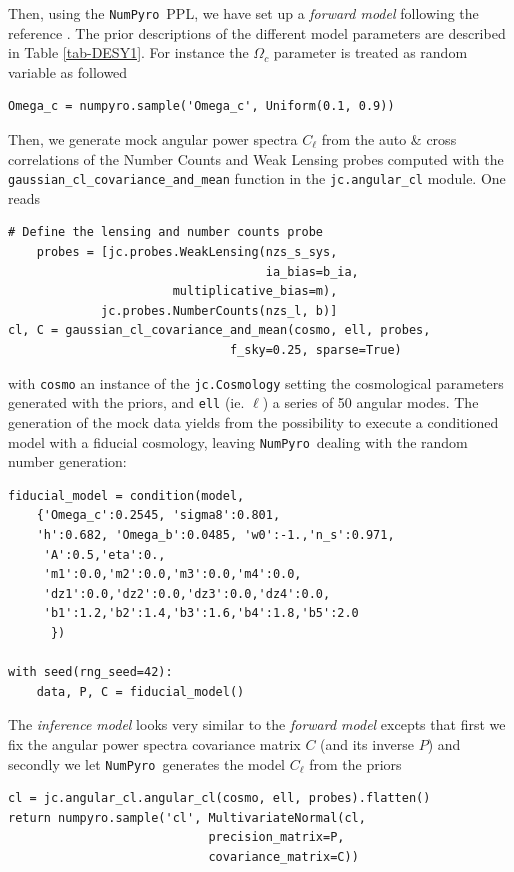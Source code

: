 \documentclass[final,5p,times,twocolumn,authoryear]{elsarticle}
\newcommand{\numpyro}{\texttt{NumPyro}}
\begin{document}
Then, using the \numpyro\ PPL, we have set up a \textit{forward model} following the reference \citep{2018PhRvD..98d3526A}. The prior descriptions of the different model parameters are described in Table \ref{tab-DESY1}.  For instance the $\Omega_c$ parameter is treated as random variable as followed
\begin{verbatim}
Omega_c = numpyro.sample('Omega_c', Uniform(0.1, 0.9))
\end{verbatim}
Then, we generate mock angular power spectra $C_\ell$ from the auto \& cross correlations of the Number Counts and Weak Lensing probes computed with the \texttt{gaussian\_cl\_covariance\_and\_mean} function in the \texttt{jc.angular\_cl} module. One reads
\begin{verbatim}
# Define the lensing and number counts probe
    probes = [jc.probes.WeakLensing(nzs_s_sys, 
                                    ia_bias=b_ia,
                       multiplicative_bias=m),
             jc.probes.NumberCounts(nzs_l, b)]
cl, C = gaussian_cl_covariance_and_mean(cosmo, ell, probes, 
                               f_sky=0.25, sparse=True)
\end{verbatim} 
with \texttt{cosmo} an instance of the \texttt{jc.Cosmology} setting the cosmological parameters generated with the priors, and \texttt{ell} (ie. $\ell$) a series of 50 angular modes. The generation of the mock data yields from the possibility to execute a conditioned model with a fiducial cosmology, leaving \numpyro\ dealing with the random number generation:
\begin{verbatim}
fiducial_model = condition(model,
    {'Omega_c':0.2545, 'sigma8':0.801, 
    'h':0.682, 'Omega_b':0.0485, 'w0':-1.,'n_s':0.971,
     'A':0.5,'eta':0.,
     'm1':0.0,'m2':0.0,'m3':0.0,'m4':0.0,
     'dz1':0.0,'dz2':0.0,'dz3':0.0,'dz4':0.0,
     'b1':1.2,'b2':1.4,'b3':1.6,'b4':1.8,'b5':2.0
      })

with seed(rng_seed=42):
    data, P, C = fiducial_model()
\end{verbatim}
The \textit{inference model} looks very similar to the \textit{forward model} excepts that first we fix the angular power spectra covariance matrix $C$ (and its inverse $P$) and secondly we let \numpyro\ generates the model $C_{\ell}$ from the priors
\begin{verbatim}
cl = jc.angular_cl.angular_cl(cosmo, ell, probes).flatten()
return numpyro.sample('cl', MultivariateNormal(cl, 
                            precision_matrix=P,
                            covariance_matrix=C))
\end{verbatim}
\end{document}

